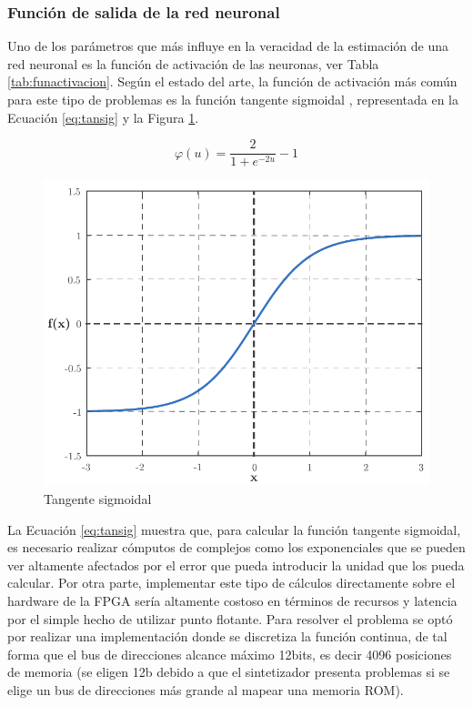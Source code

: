 \subsubsection{Función de salida de la red neuronal}

Uno de los parámetros que más influye en la veracidad de la estimación de una red neuronal es la función de activación de las neuronas, ver Tabla \ref{tab:funactivacion}. Según el estado del arte, la función de activación más común para este tipo de problemas es la función tangente sigmoidal \citep{floodfc1}, representada en la Ecuación \ref{eq:tansig} y la Figura \ref{fig:tansig}.

\begin{equation}\label{eq:tansig}
\varphi(u) = \dfrac{2}{1+e^{-2u}}-1
\end{equation}

\begin{figure}[H]
\centering
\includegraphics[scale=0.8]{./Figures/TANSIG.pdf}
\caption[Red neuronal en árbol]{Tangente sigmoidal}
\label{fig:tansig}
\end{figure}

La Ecuación \ref{eq:tansig} muestra que, para calcular la función tangente sigmoidal, es necesario realizar cómputos de complejos como los exponenciales que se pueden ver altamente afectados por el error que pueda introducir la unidad que los pueda calcular. Por otra parte, implementar este tipo de cálculos directamente sobre el hardware de la FPGA sería altamente costoso en términos de recursos y latencia por el simple hecho de utilizar punto flotante. Para resolver el problema se optó por realizar una implementación donde se discretiza la función continua, de tal forma que el bus de direcciones alcance máximo 12bits, es decir 4096 posiciones de memoria (se eligen 12b debido a que el sintetizador presenta problemas si se elige un bus de direcciones más grande al mapear una memoria ROM).

